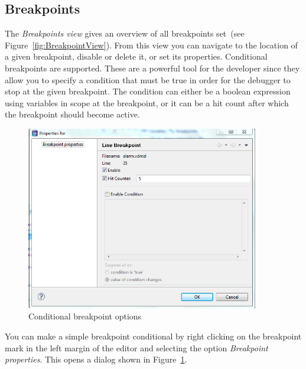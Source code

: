 \subsection{Breakpoints}
The \emph{Breakpoints view} gives an overview of all breakpoints set~(see Figure~\ref{fig:BreakpointView}). From this view you can navigate to the location of a given breakpoint, disable or delete it, or set its properties.
Conditional breakpoints are supported. These are a powerful tool for the developer since they allow you to specify a condition that must be true in order for the debugger to stop at the given breakpoint. The
condition can either be a boolean expression using variables in scope at the breakpoint, or it can be a hit count after which the breakpoint should become active.
%
\begin{figure}[htp]
\begin{center}
  \includegraphics[width=4in]{figures/Breakpointconditional}
  \caption{Conditional breakpoint options}
  \label{fig:BreakpointConditional}
\end{center}
\end{figure}
%
You can make a simple breakpoint conditional by right clicking on the breakpoint mark in the left margin of the editor and selecting the option \emph{Breakpoint properties}. This opens a dialog shown in
Figure~\ref{fig:BreakpointConditional}.


